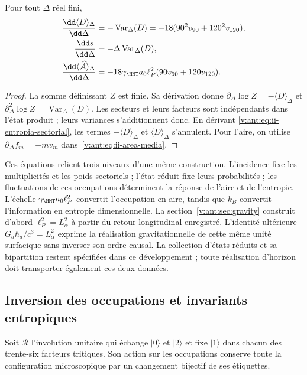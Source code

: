 \begin{proposition}
Pour tout $\Delta$ réel fini,
\begin{align}
 \frac{\dd\langle D\rangle_\Delta}{\dd\Delta}
 &=-\operatorname{Var}_\Delta(D)
   =-18(90^2v_{90}+120^2v_{120}),\\
 \frac{\dd s}{\dd\Delta}
 &=-\Delta\operatorname{Var}_\Delta(D),
 \label{v:ant:eq:ii-respuesta-entropica}\\
 \frac{\dd\langle\widehat{\mathcal A}\rangle_\Delta}{\dd\Delta}
 &=-18\gamma_{\HMT}a_0\ell_P^2(90v_{90}+120v_{120}).
 \label{v:ant:eq:ii-respuesta-areal}
\end{align}
\end{proposition}
\begin{proof}
La somme définissant $Z$ est finie. Sa dérivation donne
$\partial_\Delta\log Z=-\langle D\rangle_\Delta$ et
$\partial_\Delta^2\log Z=\operatorname{Var}_\Delta(D)$.
Les secteurs et leurs facteurs sont indépendants dans l'état produit ;
leurs variances s'additionnent donc. En dérivant
\eqref{v:ant:eq:ii-entropia-sectorial}, les termes
$-\langle D\rangle_\Delta$ et $\langle D\rangle_\Delta$
s'annulent. Pour l'aire, on utilise
$\partial_\Delta f_m=-mv_m$ dans~\eqref{v:ant:eq:ii-area-media}.
\end{proof}

Ces équations relient trois niveaux d’une même construction.
L’incidence fixe les multiplicités et les poids sectoriels ;
l’état réduit fixe leurs probabilités ; les fluctuations de ces
occupations déterminent la réponse de l’aire et de l’entropie.
L’échelle $\gamma_{\HMT}a_0\ell_P^2$ convertit l’occupation en aire,
tandis que $k_B$ convertit l’information en entropie dimensionnelle.
La section~\ref{v:ant:sec:gravity} construit d’abord
$\ell_P^2=L_\alpha^2$ à partir du retour longitudinal enregistré.
L’identité ultérieure $G_a\hbar_a/c^3=L_\alpha^2$ exprime la réalisation
gravitationnelle de cette même unité surfacique sans inverser son ordre causal.
La collection d’états réduits et sa bipartition restent spécifiées
dans ce développement ; toute réalisation d’horizon doit transporter
également ces deux données.

\subsection{Inversion des occupations et invariants entropiques}
\label{v:ant:sec:ii-inversion-sectorial}

Soit $\mathcal R$ l'involution unitaire qui échange $|0\rangle$
et $|2\rangle$ et fixe $|1\rangle$ dans chacun des trente-six
facteurs tritiques. Son action sur les occupations conserve toute la
configuration microscopique par un changement bijectif de ses étiquettes.

